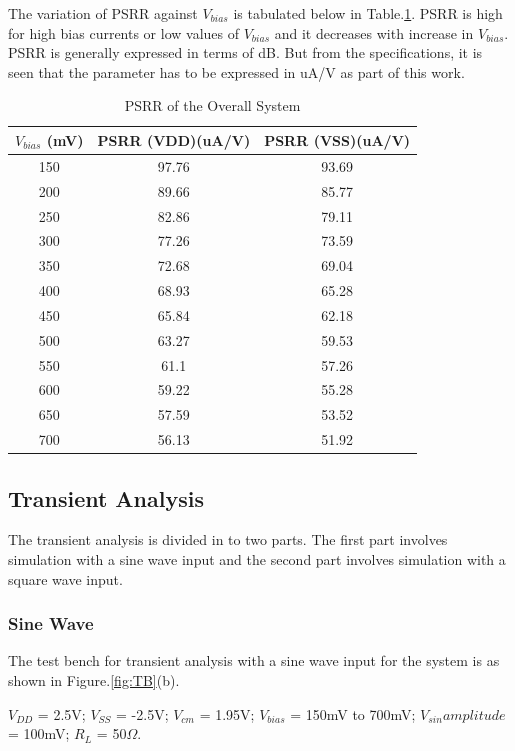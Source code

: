 The variation of PSRR against $V_{bias}$ is tabulated below in Table.\ref{tab:PSRR}. PSRR is high for high bias currents or low values of $V_{bias}$ and it decreases with increase in $V_{bias}$. PSRR is generally expressed in terms of dB. But from the specifications, it is seen that the parameter has to be expressed in uA/V as part of this work.
\begin{table} [H]
\centering
\begin{tabular}{@{}ccc@{}}
\toprule
$V_{bias}$ (mV)			& PSRR (VDD)(uA/V)			& PSRR (VSS)(uA/V)	 \\ \midrule
150					& 97.76	 					& 93.69					 \\
200					& 89.66 					& 85.77					 \\
250					& 82.86 					& 79.11					 \\
300					& 77.26 					& 73.59					 \\
350					& 72.68						& 69.04					 \\
400					& 68.93						& 65.28					 \\
450					& 65.84 					& 62.18					 \\
500					& 63.27						& 59.53					 \\
550					& 61.1	 					& 57.26					 \\
600					& 59.22 					& 55.28					 \\
650					& 57.59 					& 53.52					 \\
700 				& 56.13 					& 51.92					 \\
\bottomrule
\end{tabular}
\caption{PSRR of the Overall System}
\label{tab:PSRR}
\end{table}

\subsection{Transient Analysis}
The transient analysis is divided in to two parts. The first part involves simulation with a sine wave input and the second part involves simulation with a square wave input. 
\subsubsection{Sine Wave}
The test bench for transient analysis with a sine wave input for the system is as shown in Figure.\ref{fig:TB}(b).

$V_{DD}$ = 2.5V; $V_{SS}$ = -2.5V; $V_{cm}$ = 1.95V; $V_{bias}$ = 150mV to 700mV;  $V_{sin} amplitude$ = 100mV; $R_{L}$ = 50$\Omega$.

